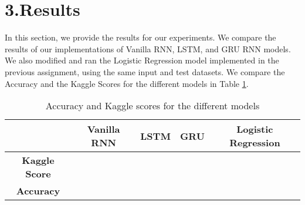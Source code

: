 
\section*{3.Results}

In this section, we provide the results for our experiments. We compare the results of our implementations of Vanilla RNN, LSTM, and GRU RNN models. We also modified and ran the Logistic Regression model implemented in the previous assignment, using the same input and test datasets. We compare the Accuracy and the Kaggle Scores for the different models in Table  \ref{result-table}.

\begin{table}[h]
\centering
\begin{tabular}{|c|c|c|c|c|}
\hline
                      & \textbf{Vanilla RNN} & \textbf{LSTM} & \textbf{GRU} & \textbf{Logistic Regression} \\ \hline
\textbf{Kaggle Score} &                      &               &              &                              \\ \hline
\textbf{Accuracy}     &                      &               &              &                              \\ \hline
\end{tabular}
\caption{Accuracy and Kaggle scores for the different models}
\label{result-table}
\end{table}
